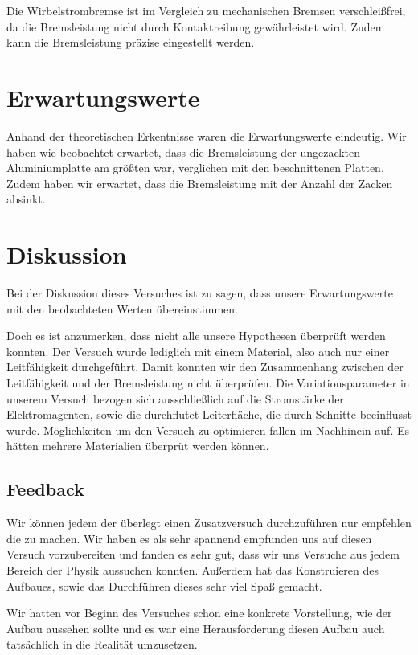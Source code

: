Die Wirbelstrombremse ist im Vergleich zu mechanischen Bremsen
verschleißfrei, da die Bremsleistung nicht durch Kontaktreibung
gewährleistet wird. Zudem kann die Bremsleistung präzise eingestellt
werden.

\section{Erwartungswerte}

Anhand der theoretischen Erkentnisse waren die Erwartungswerte eindeutig.
Wir haben wie beobachtet erwartet, dass die Bremsleistung der
ungezackten Aluminiumplatte am größten war, verglichen mit den
beschnittenen Platten.
Zudem haben wir erwartet, dass die Bremsleistung mit der Anzahl der
Zacken absinkt.

\section{Diskussion}

Bei der Diskussion dieses Versuches ist zu sagen, dass unsere Erwartungswerte
mit den beobachteten Werten übereinstimmen.

Doch es ist anzumerken, dass nicht alle unsere Hypothesen überprüft
werden konnten.
Der Versuch wurde lediglich mit einem Material, also auch nur einer
Leitfähigkeit durchgeführt. Damit konnten wir den Zusammenhang
zwischen der Leitfähigkeit und der Bremsleistung nicht überprüfen.
Die Variationsparameter in unserem Versuch bezogen sich
ausschließlich auf die Stromstärke der Elektromagenten, sowie
die durchflutet Leiterfläche, die durch Schnitte beeinflusst wurde.
Möglichkeiten um den Versuch zu optimieren fallen im Nachhinein auf.
Es hätten mehrere Materialien überprüt werden können.

\subsection{Feedback}

Wir können jedem der überlegt einen Zusatzversuch durchzuführen nur empfehlen
die zu machen. Wir haben es als sehr spannend empfunden  uns auf
diesen Versuch vorzubereiten und fanden es sehr gut, dass
wir uns Versuche aus jedem Bereich der Physik aussuchen konnten.
Außerdem hat das Konstruieren des Aufbaues, sowie das Durchführen dieses
sehr viel Spaß gemacht.

Wir hatten vor Beginn des Versuches schon eine
konkrete Vorstellung, wie der Aufbau aussehen sollte und es war
eine Herausforderung diesen Aufbau auch tatsächlich in die
Realität umzusetzen.


